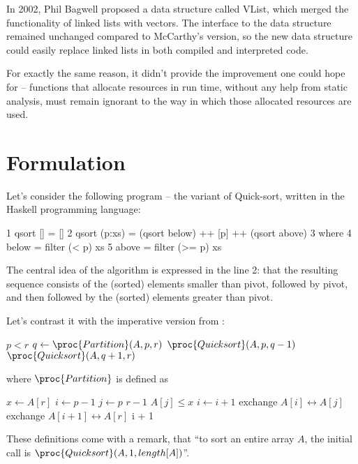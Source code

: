 In 2002, Phil Bagwell proposed a data structure called VList,
which merged the functionality of linked lists with vectors.
The interface to the data structure remained unchanged compared
to McCarthy's version, so the new data structure could easily
replace linked lists in both compiled and interpreted code\cite{Bagwell2002}.

For exactly the same reason, it didn't provide the improvement
one could hope for -- functions that allocate resources in run time,
without any help from static analysis, must remain ignorant to the
way in which those allocated resources are used.

\section{Formulation}

Let's consider the following program -- the variant of Quick-sort,
written in the Haskell programming language:

\begin{Snippet}
1 qsort [] = []
2 qsort (p:xs) = (qsort below) ++ [p] ++ (qsort above)
3     where
4         below = filter (< p) xs
5         above = filter (>= p) xs
\end{Snippet}

The central idea of the algorithm is expressed in the line 2:
that the resulting sequence consists of the (sorted) elements
smaller than pivot, followed by pivot, and then followed by the
(sorted) elements greater than pivot.

Let's contrast it with the imperative version from \cite{CLRS}:

\begin{codebox}
\li \If $p < r$
\li     \Then
           $q \gets \proc{Partition}(A,p,r)$
\li        $\proc{Quicksort}(A,p,q-1)$
\li        $\proc{Quicksort}(A,q+1,r)$
        \End
\end{codebox}

where $\proc{Partition}$ is defined as

\begin{codebox}
\li $x \gets A[r]$
\li $i \gets p-1$
\li \For $j \gets p$ \To $r-1$
\li     \Do \If $A[j] \le x$
\li             \Then $i \gets i+1$
\li                  exchange $A[i] \leftrightarrow A[j]$
\End \End
\li exchange $A[i+1] \leftrightarrow A[r]$
\li \Return i + 1   
\end{codebox}

These definitions come with a remark, that ``to sort an entire array $A$,
the initial call is $\proc{Quicksort}(A,1,length[A])$''.

